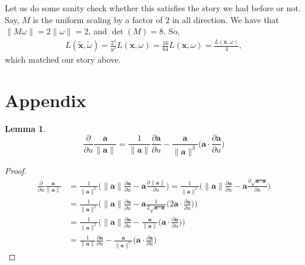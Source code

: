 \documentclass[10pt]{article}
\newtheorem{lemma}{Lemma}
\newcommand{\ve}[1]{\mathbf{#1}}
\begin{document}
  Let us do some sanity check whether this satisfies the story we had before or not.  Say, $M$ is the uniform scaling by a factor of $2$ in all direction.  We have that $\|M \omega \| = 2 \|\omega\| = 2$, and $\det(M) = 8$.  So,
  \begin{align*}
     L(\tilde{\ve{x}}, \tilde{\omega}) = \frac{2^4}{8^2} L(\ve{x},\omega) = \frac{16}{64} L(\ve{x},\omega) = \frac{L(\ve{x},\omega)}{4},
  \end{align*}
  which matched our story above. 

  \section{Appendix}

  \begin{lemma} \label{unit-deriv}
    $$ \frac{\partial}{\partial u} \frac{\ve{a}}{\|\ve{a} \|} =  \frac{1}{\| \ve{a} \|} \frac{\partial \ve{a}}{\partial u} - \frac{\ve{a}}{\| \ve{a} \|^3} \bigg( \ve{a} \cdot \frac{\partial \ve{a}}{\partial u} \bigg) $$ 
  \end{lemma}

  \begin{proof}    
    \begin{align*}
      \frac{\partial}{\partial u} \frac{\ve{a}}{\|\ve{a} \|}      
      &= \frac{1}{\|\ve{a}\|^2} \bigg( \| \ve{a} \| \frac{\partial \ve{a}}{\partial u} - \ve{a} \frac{\partial \| \ve{a} \|}{\partial u} \bigg)
      = \frac{1}{\|\ve{a}\|^2} \bigg( \| \ve{a} \| \frac{\partial \ve{a}}{\partial u} - \ve{a} \frac{\partial \sqrt{\ve{a} \cdot \ve{a}}}{\partial u} \bigg)\\
      &= \frac{1}{\|\ve{a}\|^2} \bigg( \| \ve{a} \| \frac{\partial \ve{a}}{\partial u} - \ve{a} \frac{1}{2\sqrt{\ve{a}\cdot\ve{a}}} \bigg( 2 \ve{a} \cdot \frac{\partial \ve{a}}{\partial u} \bigg)\bigg) \\
      &= \frac{1}{\|\ve{a}\|^2} \bigg( \| \ve{a} \| \frac{\partial \ve{a}}{\partial u} - \frac{\ve{a}}{\| \ve{a} \|} \bigg( \ve{a} \cdot \frac{\partial \ve{a}}{\partial u} \bigg)\bigg) \\
      &=  \frac{1}{\| \ve{a} \|} \frac{\partial \ve{a}}{\partial u} - \frac{\ve{a}}{\| \ve{a} \|^3} \bigg( \ve{a} \cdot \frac{\partial \ve{a}}{\partial u} \bigg)
    \end{align*}
  \end{proof}
\end{document}
